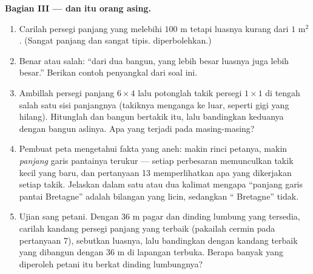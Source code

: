 \begin{problem}
\medskip
\noindent\textbf{Bagian III ---  dan  itu orang asing.}
\begin{enumerate}[resume]
  \item Carilah persegi panjang yang  melebihi $100$ m
        tetapi luasnya kurang dari $1$ m$^2$. (Sangat panjang dan
        sangat tipis.  diperbolehkan.)
  \item Benar atau salah: ``dari dua bangun, yang  lebih
        besar luasnya juga lebih besar.'' Berikan contoh penyangkal
        dari soal ini.
  \item Ambillah persegi panjang $6 \times 4$ lalu potonglah takik
        persegi $1 \times 1$ di tengah salah satu sisi panjangnya
        (takiknya menganga ke luar, seperti gigi yang hilang).
        Hitunglah  dan  bangun bertakik itu, lalu
        bandingkan keduanya dengan bangun aslinya. Apa yang terjadi
        pada masing-masing?
  \item Pembuat peta mengetahui fakta yang aneh: makin rinci petanya,
        makin \emph{panjang} garis pantainya terukur --- setiap
        perbesaran memunculkan takik kecil yang baru, dan pertanyaan
        13 memperlihatkan apa yang dikerjakan setiap takik. Jelaskan
        dalam satu atau dua kalimat mengapa ``panjang garis pantai
        Bretagne'' adalah bilangan yang licin, sedangkan ``
        Bretagne'' tidak.
  \item Ujian sang petani. Dengan $36$ m pagar dan dinding lumbung
        yang tersedia, carilah kandang persegi panjang yang terbaik
        (pakailah cermin pada pertanyaan 7), sebutkan luasnya, lalu
        bandingkan dengan kandang terbaik yang dibangun dengan $36$ m
        di lapangan terbuka. Berapa banyak yang diperoleh petani itu
        berkat dinding lumbungnya?

\end{enumerate}
\end{problem}
